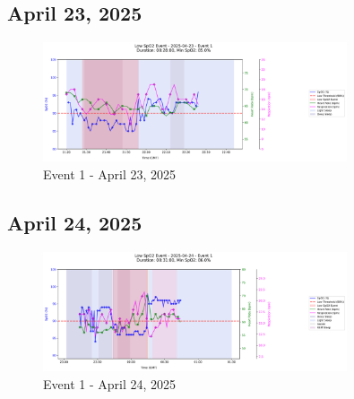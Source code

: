\documentclass{article}
\begin{document}
\subsection{April 23, 2025}
\begin{figure}[htbp]
    \centering
    \includegraphics[width=0.8\textwidth]{images/2025-04-23_event_1.png}
    \caption{Event 1 - April 23, 2025}
\end{figure}
\clearpage

\subsection{April 24, 2025}
\begin{figure}[htbp]
    \centering
    \includegraphics[width=0.8\textwidth]{images/2025-04-24_event_1.png}
    \caption{Event 1 - April 24, 2025}
\end{figure}
\clearpage
\end{document}
